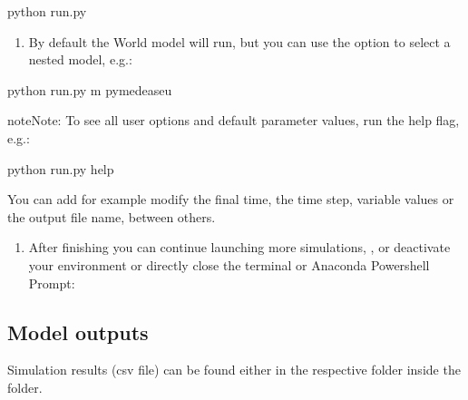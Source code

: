\documentclass[letterpaper,10pt,english]{sphinxmanual}
\begin{document}
\begin{sphinxVerbatim}[commandchars=\\\{\}]
 python run.py
\end{sphinxVerbatim}
\begin{enumerate}
%
\setcounter{enumi}{2}
\item {} 
\sphinxAtStartPar
By default the World model will run, but you can use the  option to select a nested model, e.g.:

\end{enumerate}

\begin{sphinxVerbatim}[commandchars=\\\{\}]
 python run.py \PYGZhy{}m pymedeas\PYGZus{}eu
\end{sphinxVerbatim}

\begin{sphinxadmonition}{note}{Note:}
\sphinxAtStartPar
To see all user options and default parameter values, run the help flag, e.g.:

\begin{sphinxVerbatim}[commandchars=\\\{\}]
 python run.py \PYGZhy{}\PYGZhy{}help
\end{sphinxVerbatim}

\sphinxAtStartPar
You can add for example modify the final time, the time step, variable values or the output file name, between others.
\end{sphinxadmonition}
\begin{enumerate}
%
\setcounter{enumi}{3}
\item {} 
\sphinxAtStartPar
After finishing you can continue launching more simulations, {\hyperref[\detokenize{usage:plotting-simulation-results}]{}}, or deactivate your environment or directly close the terminal or Anaconda Powershell Prompt:

\end{enumerate}


\subsection{Model outputs}
\label{\detokenize{usage:model-outputs}}
\sphinxAtStartPar
Simulation results (csv file) can be found either in the respective folder inside the  folder.
\end{document}

